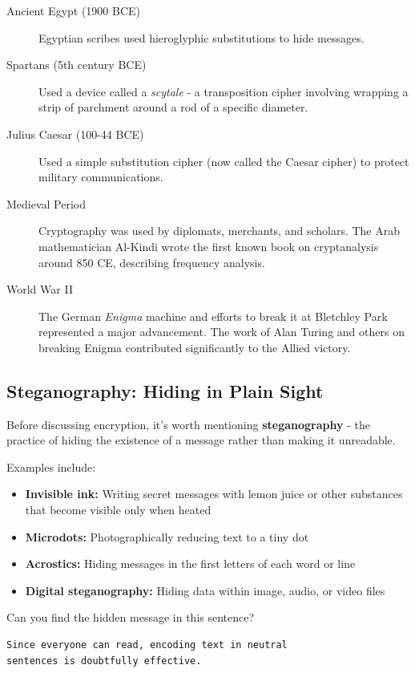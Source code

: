 \documentclass[11pt,a4paper]{report}
\begin{document}
\begin{description}
\item[Ancient Egypt (1900 BCE)] Egyptian scribes used hieroglyphic substitutions to hide messages.

\item[Spartans (5th century BCE)] Used a device called a \emph{scytale} - a transposition cipher involving wrapping a strip of parchment around a rod of a specific diameter.

\item[Julius Caesar (100-44 BCE)] Used a simple substitution cipher (now called the Caesar cipher) to protect military communications.

\item[Medieval Period] Cryptography was used by diplomats, merchants, and scholars. The Arab mathematician Al-Kindi wrote the first known book on cryptanalysis around 850 CE, describing frequency analysis.

\item[World War II] The German \emph{Enigma} machine and efforts to break it at Bletchley Park represented a major advancement. The work of Alan Turing and others on breaking Enigma contributed significantly to the Allied victory.
\end{description}

\subsection{Steganography: Hiding in Plain Sight}

Before discussing encryption, it's worth mentioning \textbf{steganography} - the practice of hiding the existence of a message rather than making it unreadable.

Examples include:
\begin{itemize}
\item \textbf{Invisible ink:} Writing secret messages with lemon juice or other substances that become visible only when heated
\item \textbf{Microdots:} Photographically reducing text to a tiny dot
\item \textbf{Acrostics:} Hiding messages in the first letters of each word or line
\item \textbf{Digital steganography:} Hiding data within image, audio, or video files
\end{itemize}

\begin{ex}
Can you find the hidden message in this sentence?
\begin{verbatim}
Since everyone can read, encoding text in neutral
sentences is doubtfully effective.
\end{verbatim}
\end{ex}
\end{document}
